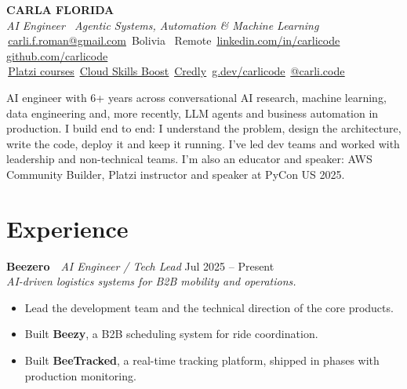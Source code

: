\documentclass[10pt,letterpaper]{article}
\newcommand{\job}[4]{%
  {\bfseries #1} \,\textbar\, {\itshape #2} \hfill {\small #3}\\
  {\small\itshape #4}\vspace{-5pt}}
\newcommand{\lnk}[3]{#1\,\href{#2}{\underline{#3}}}
\begin{document}
\pagestyle{empty}

\begin{center}
{\fontsize{26}{28}\selectfont\bfseries CARLA \textmd{FLORIDA}}\\[3pt]
{\large\itshape AI Engineer \textbar\ Agentic Systems, Automation \& Machine Learning}\\[6pt]
\small
\lnk{\faEnvelope}{mailto:carli.f.roman@gmail.com}{carli.f.roman@gmail.com} \quad
\faMapMarker*\,Bolivia \textbullet\ Remote \quad
\lnk{\faLinkedin}{https://www.linkedin.com/in/carlicode/}{linkedin.com/in/carlicode} \quad
\lnk{\faGithub}{https://github.com/carlicode}{github.com/carlicode}\\[2pt]
\lnk{\faChalkboardTeacher}{https://platzi.com/profes/carlicode/}{Platzi courses} \quad
\lnk{\faGoogle}{https://www.cloudskillsboost.google/public_profiles/14e01263-8531-4600-88a2-320eea1f6c27}{Cloud Skills Boost} \quad
\lnk{\faCertificate}{https://www.credly.com/users/carli-code}{Credly} \quad
\lnk{\faCode}{https://g.dev/carlicode}{g.dev/carlicode} \quad
\lnk{\faInstagram}{https://www.instagram.com/carli.code/}{@carli.code}
\normalsize
\end{center}
\vspace{-8pt}

AI engineer with 6+ years across conversational AI research, machine learning, data engineering and,
more recently, LLM agents and business automation in production. I build end to end: I understand the
problem, design the architecture, write the code, deploy it and keep it running. I've led dev teams
and worked with leadership and non-technical teams. I'm also an educator and speaker:
AWS Community Builder, Platzi instructor and speaker at PyCon US 2025.

\section*{Experience}

\job{Beezero}{AI Engineer / Tech Lead}{Jul 2025 -- Present}{AI-driven logistics systems for B2B mobility and operations.}
\begin{itemize}
  \item Lead the development team and the technical direction of the core products.
  \item Built \textbf{Beezy}, a B2B scheduling system for ride coordination.
  \item Built \textbf{BeeTracked}, a real-time tracking platform, shipped in phases with production monitoring.
\end{itemize}
\vspace{1pt}
\end{document}
